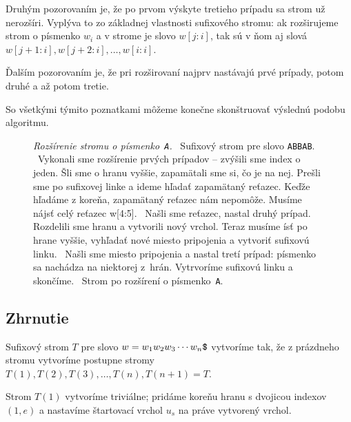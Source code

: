 Druhým pozorovaním je, že po prvom výskyte tretieho prípadu sa strom už 
nerozšíri. Vyplýva to zo základnej vlastnosti sufixového stromu: ak 
rozširujeme strom o písmenko $w_i$ a v strome je slovo $w[j:i]$, tak 
sú v ňom aj slová $w[j+1:i], w[j+2:i], \ldots, w[i:i]$.

Ďalším pozorovaním je, že pri rozširovaní najprv nastávajú prvé prípady, 
potom druhé a až potom tretie.

So všetkými týmito poznatkami môžeme konečne skonštruovať výslednú podobu 
algoritmu.

\def\wTwo{0.65}
\begin{figure}
\centering
{}
\quad
{}
\quad
{}

{}
\qquad
{}
\caption{\emph{Rozšírenie stromu o písmenko~{\tt A}.} 
~Sufixový strom pre slovo {\tt ABBAB}. 
~Vykonali sme rozšírenie prvých prípadov -- zvýšili sme index o 
jeden. Šli sme o hranu vyššie, zapamätali sme si, čo je na nej. Prešli sme 
po sufixovej linke a ideme hľadať zapamätaný reťazec. Keďže hľadáme z koreňa, 
zapamätaný reťazec nám nepomôže. Musíme nájsť celý reťazec {w[4:5]}. 
~Našli sme reťazec, nastal druhý prípad. Rozdelili sme hranu a 
vytvorili nový vrchol. Teraz musíme ísť po hrane vyššie, vyhľadať nové miesto 
pripojenia a vytvoriť sufixovú linku. 
~Našli sme miesto pripojenia a nastal tretí prípad: písmenko sa 
nachádza na niektorej z~hrán. Vytrvoríme sufixovú linku a skončíme. 
~Strom po rozšírení o písmenko~{\tt A}.
}
\label{img:sxr}
\end{figure}

\subsection{Zhrnutie}

Sufixový strom $T$ pre slovo $w = w_1w_2w_3\cdots w_n\hbox{\tt\$}$ vytvoríme tak, že z 
prázdneho stromu vytvoríme postupne stromy $T(1), T(2), T(3),\ldots, T(n), 
T(n+1) = T$. 

Strom $T(1)$ vytvoríme triviálne; pridáme koreňu hranu s dvojicou indexov 
$(1, e)$ a nastavíme štartovací vrchol $u_s$ na práve vytvorený vrchol.

